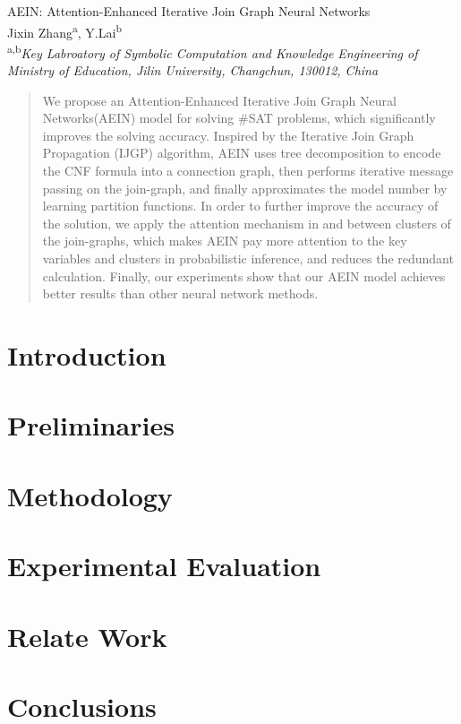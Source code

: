 \documentclass{article}
\begin{document}
\begin{center}
    {\LARGE {AEIN: Attention-Enhanced Iterative Join Graph Neural Networks}} \\[1.5em]
    Jixin Zhang\textsuperscript{a}, Y.Lai\textsuperscript{b} \\[0.5em]
    {\small \textsuperscript{a,b}\textit{Key Labroatory of Symbolic Computation and Knowledge Engineering of Ministry of Education, Jilin University, Changchun, 130012, China}}
\end{center}
\begin{abstract}
We propose an Attention-Enhanced Iterative Join Graph Neural Networks(AEIN) model for solving \#SAT problems, which significantly improves the solving accuracy. Inspired by the Iterative Join Graph Propagation (IJGP) algorithm, AEIN uses tree decomposition to encode the CNF formula into a connection graph, then performs iterative message passing on the join-graph, and finally approximates the model number by learning partition functions. In order to further improve the accuracy of the solution, we apply the attention mechanism in and between clusters of the join-graphs, which makes AEIN pay more attention to the key variables and clusters in probabilistic inference, and reduces the redundant calculation. Finally, our experiments show that our AEIN model achieves better results than other neural network methods.
\end{abstract}

\section{Introduction}

\section{Preliminaries}

\section{Methodology}

\section{Experimental Evaluation}

\section{Relate Work}

\section{Conclusions}




\end{document}
